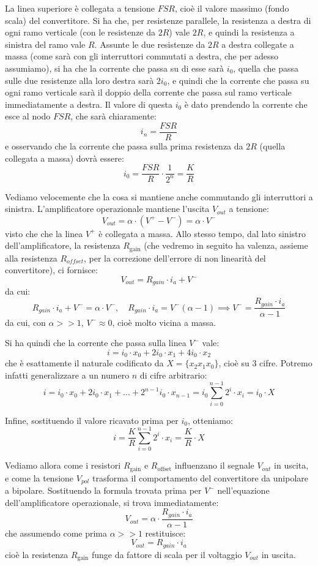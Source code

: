 \documentclass[a4paper,11pt]{article}
\begin{document}
La linea superiore è collegata a tensione $FSR$, cioè il valore massimo (fondo scala) del convertitore.
Si ha che, per resistenze parallele, la resistenza a destra di ogni ramo verticale (con le resistenze da $2R$) vale $2R$, e quindi la resistenza a sinistra del ramo vale $R$.
Assunte le due resistenze da $2R$ a destra collegate a massa (come sarà con gli interruttori commutati a destra, che per adesso assumiamo), si ha che la corrente che passa su di esse sarà $i_0$, quella che passa sulle due resistenze alla loro destra sarà $2 i_0$, e quindi che la corrente che passa su ogni ramo verticale sarà il doppio della corrente che passa sul ramo verticale immediatamente a destra.
Il valore di questa $i_0$ è dato prendendo la corrente che esce al nodo $FSR$, che sarà chiaramente:
$$
i_n = \frac{FSR}{R}
$$
e osservando che la corrente che passa sulla prima resistenza da $2R$ (quella collegata a massa) dovrà essere:
$$
i_0 = \frac{FSR}{R} \cdot \frac{1}{2^n} = \frac{K}{R}
$$

Vediamo velocemente che la cosa si mantiene anche commutando gli interruttori a sinistra. L'amplificatore operazionale mantiene l'uscita $V_{out}$ a tensione:
$$
V_{out} = \alpha \cdot (V^+ - V^-) = \alpha \cdot V^-
$$
visto che che la linea $V^+$ è collegata a massa.
Allo stesso tempo, dal lato sinistro dell'amplificatore, la resistenza $R_\text{gain}$ (che vedremo in seguito ha valenza, assieme alla resistenza $R_{offset}$, per la correzione dell'errore di non linearità del convertitore), ci fornisce:
$$
V_{out} = R_{gain} \cdot i_a + V^-
$$
da cui:
$$
R_{gain} \cdot i_a + V^- = \alpha \cdot V^-, \quad R_{gain} \cdot i_a = V^- (\alpha - 1) \implies V^- = \frac{R_{gain} \cdot i_a}{\alpha - 1}
$$
da cui, con $\alpha >> 1$, $V^- \approx 0$, cioè molto vicina a massa.

Si ha quindi che la corrente che passa sulla linea $V^-$ vale:
$$
i = i_0 \cdot x_0 + 2 i_0 \cdot x_1 + 4 i_0 \cdot x_2
$$
che è esattamente il naturale codificato da $ X = \{x_2 x_1 x_0\}$, cioè su 3 cifre.
Potremo infatti generalizzare a un numero $n$ di cifre arbitrario:
$$
i = i_0 \cdot x_0 + 2 i_0 \cdot x_1 + ... + 2^{n-1} i_0 \cdot x_{n-1} = i_0 \sum_{i=0}^{n-1} 2^i \cdot x_i = i_0 \cdot X
$$

Infine, sostituendo il valore ricavato prima per $i_0$, otteniamo:
$$
i = \frac{K}{R} \sum_{i = 0}^{n - 1} 2^i \cdot x_i = \frac{K}{R} \cdot X
$$

Vediamo allora come i resistori $R_\text{gain}$ e $R_\text{offset}$ influenzano il segnale $V_{out}$ in uscita, e come la tensione $V_{pol}$ trasforma il comportamento del convertitore da unipolare a bipolare.
Sostituendo la formula trovata prima per $V^-$ nell'equazione dell'amplificatore operazionale, si trova immediatamente:
$$
V_{out} = \alpha \cdot \frac{R_{gain} \cdot i_a}{\alpha - 1}
$$
che assumendo come prima $\alpha >> 1$ restituisce:
$$
V_{out} = R_{gain} \cdot i_a
$$
cioè la resistenza $R_\text{gain}$ funge da fattore di scala per il voltaggio $V_{out}$ in uscita.
\end{document}
